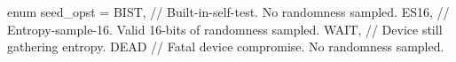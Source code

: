 enum seed_opst = {
  BIST, // Built-in-self-test. No randomness sampled.
  ES16, // Entropy-sample-16. Valid 16-bits of randomness sampled.
  WAIT, // Device still gathering entropy.
  DEAD  // Fatal device compromise. No randomness sampled.
}
